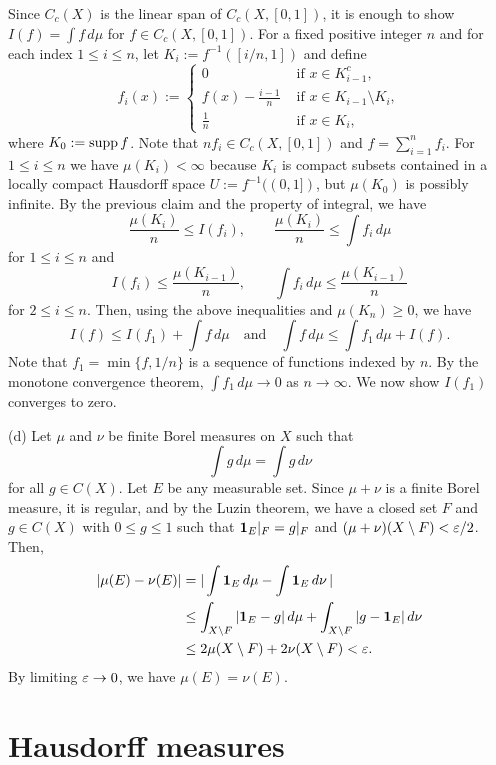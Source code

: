 \documentclass{../../large}
\begin{document}
\begin{pf}
Since $C_c(X)$ is the linear span of $C_c(X,[0,1])$, it is enough to show $I(f)=\int f\,d\mu$ for $f\in C_c(X,[0,1])$.
For a fixed positive integer $n$ and for each index $1\le i\le n$, let $K_i:=f^{-1}([i/n,1])$ and define
\[f_i(x):=\begin{cases}0&\text{ if }x\in K_{i-1}^c,\\f(x)-\frac{i-1}n&\text{ if }x\in K_{i-1}\setminus K_i,\\\frac1n&\text{ if }x\in K_i,\end{cases}\]
where $K_0:=\operatorname{supp} f$.
Note that $nf_i\in C_c(X,[0,1])$ and $f=\sum_{i=1}^nf_i$.
For $1\le i\le n$ we have $\mu(K_i)<\infty$ because $K_i$ is compact subsets contained in a locally compact Hausdorff space $U:=f^{-1}((0,1])$, but $\mu(K_0)$ is possibly infinite.
By the previous claim and the property of integral, we have
\[\frac{\mu(K_i)}n\le I(f_i),\qquad\frac{\mu(K_i)}n\le\int f_i\,d\mu\]
for $1\le i\le n$ and
\[I(f_i)\le\frac{\mu(K_{i-1})}n,\qquad\int f_i\,d\mu\le\frac{\mu(K_{i-1})}n\]
for $2\le i\le n$.
Then, using the above inequalities and $\mu(K_n)\ge0$, we have
\[I(f)\le I(f_1)+\int f\,d\mu\quad\text{and}\quad\int f\,d\mu\le\int f_1\,d\mu+I(f).\]
Note that $f_1=\min\{f,1/n\}$ is a sequence of functions indexed by $n$.
By the monotone convergence theorem, $\int f_1\,d\mu\to0$ as $n\to\infty$.
We now show $I(f_1)$ converges to zero.

(d)
Let $\mu$ and $\nu$ be finite Borel measures on $X$ such that
\[\int g\,d\mu=\int g\,d\nu\]
for all $g\in C(X)$.
Let $E$ be any measurable set.
Since $\mu+\nu$ is a finite Borel measure, it is regular, and by the Luzin theorem, we have a closed set $F$ and $g\in C(X)$ with $0\le g\le1$ such that $\mathbf{1}_E|_F=g|_F$ and $(\mu+\nu)(X\setminus F)<\varepsilon/2$.
Then,
\begin{align*}
|\mu(E)-\nu(E)|&=|\int\mathbf{1}_E\,d\mu-\int\mathbf{1}_E\,d\nu\,|\\
&\le\int_{X\setminus F}|\mathbf{1}_E-g|\,d\mu+\int_{X\setminus F}|g-\mathbf{1}_E|\,d\nu\\
&\le2\mu(X\setminus F)+2\nu(X\setminus F)<\varepsilon.
\end{align*}
By limiting $\varepsilon\to0$, we have $\mu(E)=\nu(E)$.
\end{pf}


\begin{prb}
\end{prb}



\section{Hausdorff measures}
\end{document}

